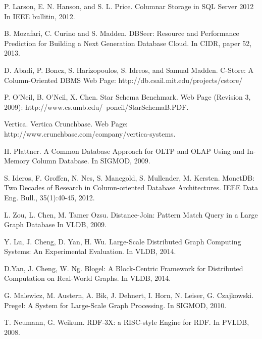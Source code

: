 \begin{thebibliography}{1}
P. Larson, E. N. Hanson, and S. L. Price.
Columnar Storage in SQL Server 2012
In IEEE bullitin, 2012.


B. Mozafari, C. Curino and S. Madden.
DBSeer: Resource and Performance Prediction for Building a Next Generation Database Cloud.
In CIDR, paper 52, 2013.

D. Abadi, P. Boncz, S. Harizopoulos, S. Idreos, and Samual Madden.
C-Store: A Column-Oriented DBMS
Web Page: http://db.csail.mit.edu/projects/cstore/


P. O'Neil, B. O'Neil, X. Chen.
Star Schema Benchmark.
Web Page (Revision 3, 2009): http://www.cs.umb.edu/~poneil/StarSchemaB.PDF.


Vertica.
Vertica Crunchbase.
Web Page: http://www.crunchbase.com/company/vertica-systems.


H. Plattner.
A Common Database Approach for OLTP and OLAP Using and In-Memory Column Database.
In SIGMOD, 2009.

S. Ideros, F. Groffen, N. Nes, S. Manegold, S. Mullender, M. Kersten.
MonetDB: Two Decades of Research in Column-oriented Database Architectures.
IEEE Data Eng. Bull., 35(1):40-45, 2012.


L. Zou, L. Chen, M. Tamer Ozsu.
Distance-Join: Pattern Match Query in a Large Graph Database
In VLDB, 2009.

Y. Lu, J. Cheng, D. Yan, H. Wu.
Large-Scale Distributed Graph Computing Systems: An Experimental Evaluation.
In VLDB, 2014.

D.Yan, J. Cheng, W. Ng.
Blogel: A Block-Centric Framework for Distributed Computation on Real-World Graphs.
In VLDB, 2014.

G. Malewicz, M. Austern, A. Bik, J. Dehnert, I. Horn, N. Leiser, G. Czajkowski.
Pregel: A System for Large-Scale Graph Processing.
In SIGMOD, 2010.

T. Neumann, G. Weikum.
RDF-3X: a RISC-style Engine for RDF.
In PVLDB, 2008.




\end{thebibliography}



